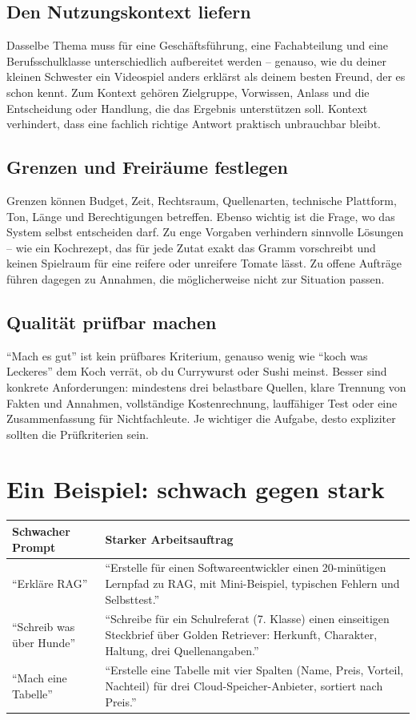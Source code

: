 \subsection{Den Nutzungskontext liefern}
Dasselbe Thema muss für eine Geschäftsführung, eine Fachabteilung und eine Berufsschulklasse unterschiedlich aufbereitet werden -- genauso, wie du deiner kleinen Schwester ein Videospiel anders erklärst als deinem besten Freund, der es schon kennt. Zum Kontext gehören Zielgruppe, Vorwissen, Anlass und die Entscheidung oder Handlung, die das Ergebnis unterstützen soll. Kontext verhindert, dass eine fachlich richtige Antwort praktisch unbrauchbar bleibt.

\subsection{Grenzen und Freiräume festlegen}
Grenzen können Budget, Zeit, Rechtsraum, Quellenarten, technische Plattform, Ton, Länge und Berechtigungen betreffen. Ebenso wichtig ist die Frage, wo das System selbst entscheiden darf. Zu enge Vorgaben verhindern sinnvolle Lösungen -- wie ein Kochrezept, das für jede Zutat exakt das Gramm vorschreibt und keinen Spielraum für eine reifere oder unreifere Tomate lässt. Zu offene Aufträge führen dagegen zu Annahmen, die möglicherweise nicht zur Situation passen.

\subsection{Qualität prüfbar machen}
``Mach es gut'' ist kein prüfbares Kriterium, genauso wenig wie ``koch was Leckeres'' dem Koch verrät, ob du Currywurst oder Sushi meinst. Besser sind konkrete Anforderungen: mindestens drei belastbare Quellen, klare Trennung von Fakten und Annahmen, vollständige Kostenrechnung, lauffähiger Test oder eine Zusammenfassung für Nichtfachleute. Je wichtiger die Aufgabe, desto expliziter sollten die Prüfkriterien sein.

\section{Ein Beispiel: schwach gegen stark}

\begin{tabularx}{\textwidth}{@{}p{}X@{}}\toprule
\textbf{Schwacher Prompt}&\textbf{Starker Arbeitsauftrag}\\\midrule
``Erkläre RAG''&``Erstelle für einen Softwareentwickler einen 20-minütigen Lernpfad zu RAG, mit Mini-Beispiel, typischen Fehlern und Selbsttest.''\\
``Schreib was über Hunde''&``Schreibe für ein Schulreferat (7. Klasse) einen einseitigen Steckbrief über Golden Retriever: Herkunft, Charakter, Haltung, drei Quellenangaben.''\\
``Mach eine Tabelle''&``Erstelle eine Tabelle mit vier Spalten (Name, Preis, Vorteil, Nachteil) für drei Cloud-Speicher-Anbieter, sortiert nach Preis.''\\\bottomrule
\end{tabularx}

